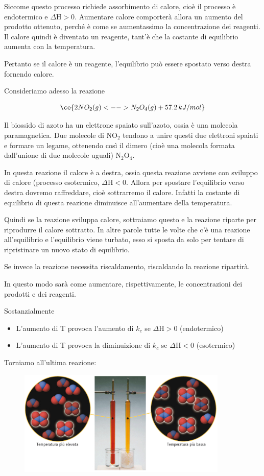 Siccome questo processo richiede assorbimento di calore, cioè il processo è endotermico e $\Delta$H$>0$. Aumentare calore comporterà allora un aumento del prodotto ottenuto, perché è come se aumentassimo la concentrazione dei reagenti. Il calore quindi è diventato un reagente, tant'è che la costante di equilibrio aumenta con la temperatura.

Pertanto se il calore è un reagente, l'equilibrio può essere spostato verso destra fornendo calore.

Consideriamo adesso la reazione

$$\ce{2NO_2(g) <--> N_2O_4(g) + 57.2 \, kJ/mol}$$

Il biossido di azoto ha un elettrone spaiato sull'azoto, ossia è una molecola paramagnetica. Due molecole di NO$_2$ tendono a unire questi due elettroni spaiati e formare un legame, ottenendo così il dimero (cioè una molecola formata dall'unione di due molecole uguali) N$_2$O$_4$.

In questa reazione il calore è a destra, ossia questa reazione avviene con sviluppo di calore (processo esotermico, $\Delta$H$<$0. Allora per spostare l'equilibrio verso destra dovremo raffreddare, cioè sottrarremo il calore. Infatti la costante di equilibrio di questa reazione diminuisce all'aumentare della temperatura.

Quindi se la reazione sviluppa calore, sottraiamo questo e la reazione riparte per riprodurre il calore sottratto. In altre parole tutte le volte che c'è una reazione all'equilibrio e l'equilibrio viene turbato, esso si sposta da solo per tentare di ripristinare un nuovo stato di equilibrio.

Se invece la reazione necessita riscaldamento, riscaldando la reazione ripartirà.

In questo modo sarà come aumentare, rispettivamente, le concentrazioni dei prodotti e dei reagenti.

Sostanzialmente

\begin{itemize}
    \item L'aumento di T provoca l'aumento di $k_c$ se $\Delta$H$>$0 (endotermico)
    \item L'aumento di T provoca la diminuizione di $k_c$ se $\Delta$H$<$0 (esotermico)
\end{itemize}

Torniamo all'ultima reazione:

\begin{figure}[htp]
    \centering
    \includegraphics[width=10cm]{immagini/reazione_NO_2.png}
\end{figure}


